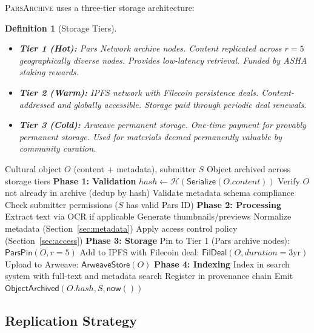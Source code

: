 \documentclass[11pt,a4paper]{article}
\newcommand{\parsarch}{\textsc{ParsArchive}\xspace}
\newcommand{\HH}{\mathcal{H}}
\newtheorem{definition}{Definition}
\begin{document}
\parsarch uses a three-tier storage architecture:

\begin{definition}[Storage Tiers]
\begin{itemize}
    \item \textbf{Tier 1 (Hot):} Pars Network archive nodes. Content replicated across $r = 5$ geographically diverse nodes. Provides low-latency retrieval. Funded by ASHA staking rewards.
    \item \textbf{Tier 2 (Warm):} IPFS network with Filecoin persistence deals. Content-addressed and globally accessible. Storage paid through periodic deal renewals.
    \item \textbf{Tier 3 (Cold):} Arweave permanent storage. One-time payment for provably permanent storage. Used for materials deemed permanently valuable by community curation.
\end{itemize}
\end{definition}

\begin{algorithm}[H]
\caption{Object Ingestion Pipeline}
\label{alg:ingest}
\begin{algorithmic}[1]
\Require Cultural object $O$ (content + metadata), submitter $S$
\Ensure Object archived across storage tiers
\Statex \textbf{Phase 1: Validation}
\State $\mathit{hash} \leftarrow \HH(\mathsf{Serialize}(O.\mathit{content}))$
\State Verify $O$ not already in archive (dedup by hash)
\State Validate metadata schema compliance
\State Check submitter permissions ($S$ has valid Pars ID)
\Statex \textbf{Phase 2: Processing}
\State Extract text via OCR if applicable
\State Generate thumbnails/previews
\State Normalize metadata (Section~\ref{sec:metadata})
\State Apply access control policy (Section~\ref{sec:access})
\Statex \textbf{Phase 3: Storage}
\State Pin to Tier 1 (Pars archive nodes): $\mathsf{ParsPin}(O, r=5)$
\State Add to IPFS with Filecoin deal: $\mathsf{FilDeal}(O, \mathit{duration}=3\text{yr})$
 
    \State Upload to Arweave: $\mathsf{ArweaveStore}(O)$
\EndIf
\Statex \textbf{Phase 4: Indexing}
\State Index in search system with full-text and metadata search
\State Register in provenance chain
\State Emit $\mathsf{ObjectArchived}(O.\mathit{hash}, S, \mathsf{now}())$
\end{algorithmic}
\end{algorithm}

\subsection{Replication Strategy}
\end{document}
